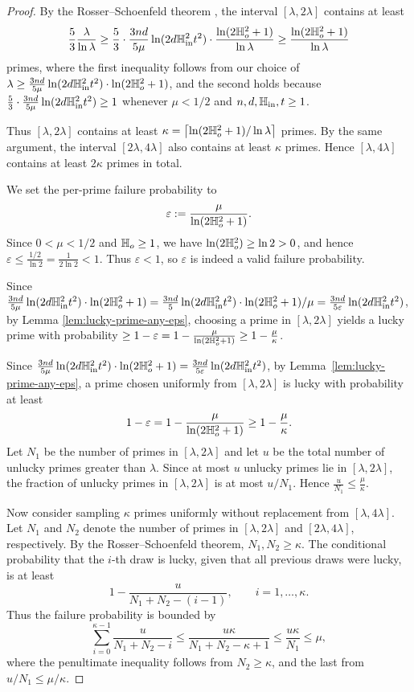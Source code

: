 \documentclass{article}
\numberwithin{equation}{section}
\begin{document}
\begin{proof}
%
%
By the Rosser--Schoenfeld theorem \cite[Cor.~3]{1962Approximate}, the interval $[\lambda, 2\lambda]$ contains at least
\[
\frac{5}{3}\frac{\lambda}{\ln\lambda}
\ge 
\frac{5}{3}\cdot \frac{3nd}{5\mu} \ln(2d \mathbb{H}_{\rm in}^2 t^2)\cdot \frac{\ln(2\mathbb{H}_{o}^2+1)}{\ln \lambda}
\ge \frac{\ln(2\mathbb{H}_{o}^2+1)}{\ln \lambda}
\]
primes, where the first inequality follows from our choice of $\lambda\ge \frac{3nd}{5\mu} \ln(2d \mathbb{H}_{\rm in}^2 t^2)\cdot \ln(2\mathbb{H}_{o}^2+1)$, and the second holds because $\frac{5}{3}\cdot \frac{3nd}{5\mu} \ln(2d \mathbb{H}_{\rm in}^2 t^2)\ge 1$ whenever $\mu < 1/2$ and $n,d,\mathbb{H}_{\rm in},t \ge 1$.

Thus $[\lambda, 2\lambda]$ contains at least $\kappa=\left\lceil \ln(2\mathbb{H}_{o}^2+1) / \ln \lambda \right\rceil$ primes. By the same argument, the interval $[2\lambda, 4\lambda]$ also contains at least $\kappa$ primes. Hence $[\lambda, 4\lambda]$ contains at least $2\kappa$ primes in total.


We set the per-prime failure probability to
\[
\varepsilon := \frac{\mu}{\ln(2\mathbb{H}_{o}^2+1)}.
\]
Since \(0 < \mu < 1/2\) and \(\mathbb{H}_{o} \ge 1\), we have \(\ln(2\mathbb{H}_{o}^2) \ge \ln 2 > 0\), and hence
%
$\varepsilon \le \frac{1/2}{\ln 2} = \frac{1}{2\ln 2} < 1.$
%
Thus \(\varepsilon < 1\), so \(\varepsilon\) is indeed a valid failure probability.


Since $ \frac{3nd}{5\mu} \ln(2d \mathbb{H}_{\rm in}^2 t^2)\cdot \ln(2\mathbb{H}_{o}^2+1)=\frac{3nd}{5}\ln(2d \mathbb{H}_{\rm in}^2 t^2)\cdot \ln(2\mathbb{H}_{o}^2+1)/\mu =\frac{3nd}{5\varepsilon}\ln(2d \mathbb{H}_{\rm in}^2 t^2)$, by Lemma \ref{lem:lucky-prime-any-eps}, choosing a prime in $[\lambda,2\lambda]$ yields a lucky prime with probability $\ge 1-\varepsilon=1-\frac{\mu}{\ln(2\mathbb{H}_{o}^2+1)}\ge 1-\frac{\mu}{\kappa}$. 



Since $\frac{3nd}{5\mu} \ln(2d \mathbb{H}_{\rm in}^2 t^2)\cdot \ln(2\mathbb{H}_{o}^2+1)
= \frac{3nd}{5\varepsilon}\ln(2d \mathbb{H}_{\rm in}^2 t^2)$,
by Lemma~\ref{lem:lucky-prime-any-eps}, a prime chosen uniformly from $[\lambda, 2\lambda]$ is lucky with probability at least
\[
1-\varepsilon = 1 - \frac{\mu}{\ln(2\mathbb{H}_{o}^2+1)} \ge 1 - \frac{\mu}{\kappa}.
\]
Let $N_1$ be the number of primes in $[\lambda, 2\lambda]$ and let $u$ be the total number of unlucky primes greater than $\lambda$. Since at most $u$ unlucky primes lie in $[\lambda, 2\lambda]$, the fraction of unlucky primes in $[\lambda, 2\lambda]$ is at most $u/N_1$. Hence
%
$\frac{u}{N_1} \le \frac{\mu}{\kappa}.$


Now consider sampling $\kappa$ primes uniformly without replacement from $[\lambda, 4\lambda]$. Let $N_1$ and $N_2$ denote the number of primes in $[\lambda, 2\lambda]$ and $[2\lambda, 4\lambda]$, respectively. By the Rosser--Schoenfeld theorem, $N_1, N_2 \ge \kappa$. The conditional probability that the $i$-th draw is lucky, given that all previous draws were lucky, is at least
\[
1 - \frac{u}{N_1 + N_2 - (i-1)}, \qquad i = 1, \dots, \kappa.
\]
Thus the failure probability is bounded by
\[
\sum_{i=0}^{\kappa-1} \frac{u}{N_1 + N_2 - i}
\le \frac{u\kappa}{N_1 + N_2 - \kappa + 1}
\le \frac{u\kappa}{N_1}
\le \mu,
\]
where the penultimate inequality follows from $N_2 \ge \kappa$, and the last from $u/N_1 \le \mu/\kappa$.


\end{proof}
\end{document}
